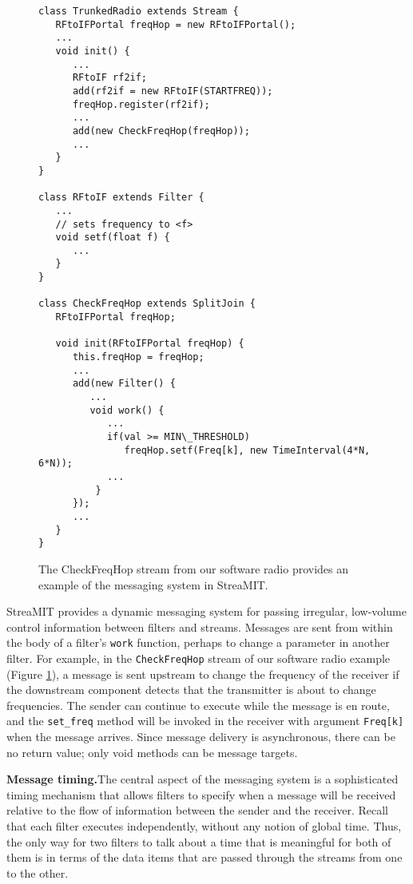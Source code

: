 \begin{figure}
\scriptsize
\begin{verbatim}
class TrunkedRadio extends Stream {
   RFtoIFPortal freqHop = new RFtoIFPortal();
   ...
   void init() {
      ...
      RFtoIF rf2if;
      add(rf2if = new RFtoIF(STARTFREQ));
      freqHop.register(rf2if);
      ...
      add(new CheckFreqHop(freqHop));
      ...
   }
}

class RFtoIF extends Filter {
   ...
   // sets frequency to <f>
   void setf(float f) {
      ...
   }
}

class CheckFreqHop extends SplitJoin {
   RFtoIFPortal freqHop;

   void init(RFtoIFPortal freqHop) {
      this.freqHop = freqHop;
      ...
      add(new Filter() {
         ...
         void work() {
            ... 
            if(val >= MIN\_THRESHOLD) 
               freqHop.setf(Freq[k], new TimeInterval(4*N, 6*N)); 
            ...
          }
      });
      ...
   }
}
\end{verbatim}
\vspace{-12pt}
\caption{\protect\small The CheckFreqHop stream from our software
   radio provides an example of the messaging system in StreaMIT.
\protect\label{fig:mess}}
\vspace{-12pt}
\end{figure}

StreaMIT provides a dynamic messaging system for passing irregular,
low-volume control information between filters and streams.  Messages
are sent from within the body of a filter's {\tt work} function,
perhaps to change a parameter in another filter.  For example, in the
{\tt CheckFreqHop} stream of our software radio example (Figure
\ref{fig:mess}), a message is sent upstream to change the frequency of
the receiver if the downstream component detects that the transmitter
is about to change frequencies.  The sender can continue to execute
while the message is en route, and the {\tt set\_freq} method will be
invoked in the receiver with argument {\tt Freq[k]} when the message
arrives.  Since message delivery is asynchronous, there can be no
return value; only void methods can be message targets.

{\bf Message timing.}The central aspect of the messaging system is a
sophisticated timing mechanism that allows filters to specify when a
message will be received relative to the flow of information between
the sender and the receiver.  Recall that each filter executes
independently, without any notion of global time.  Thus, the only way
for two filters to talk about a time that is meaningful for both of
them is in terms of the data items that are passed through the streams
from one to the other.

